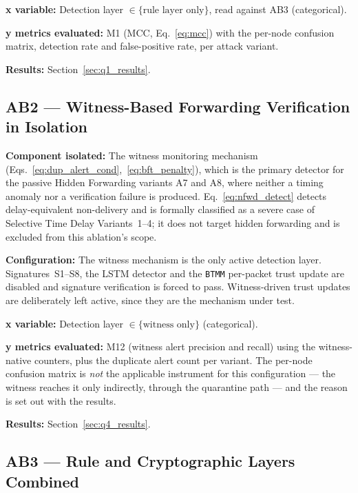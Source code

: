 \documentclass[12pt, a4paper]{report}
\begin{document}
{{\textbf{x variable:} Detection layer
$\in \{\text{rule layer only}\}$, read against AB3
(categorical).

\textbf{y metrics evaluated:} M1 (\ac{MCC},
Eq.~\ref{eq:mcc}) with the per-node confusion matrix,
detection rate and false-positive rate, per attack
variant.

\textbf{Results:} Section~\ref{sec:q1_results}.

\subsection{AB2 --- Witness-Based Forwarding
Verification in Isolation}
\label{sec:ab2}

\textbf{Component isolated:}
The witness monitoring mechanism
(Eqs.~\ref{eq:dup_alert_cond},~\ref{eq:bft_penalty}),
which is the primary detector for the passive
Hidden Forwarding variants A7 and A8, where neither
a timing anomaly nor a verification failure is
produced. Eq.~\ref{eq:nfwd_detect} detects
delay-equivalent non-delivery and is formally
classified as a severe case of Selective Time Delay
Variants~1--4; it does not target hidden forwarding
and is excluded from this ablation's scope.

\textbf{Configuration:}
The witness mechanism is the only active detection
layer. Signatures~S1--S8, the \ac{LSTM} detector and
the \texttt{BTMM} per-packet trust update are
disabled and signature verification is forced to
pass. Witness-driven trust updates are deliberately
left active, since they are the mechanism under
test.

\textbf{x variable:} Detection layer
$\in \{\text{witness only}\}$ (categorical).

\textbf{y metrics evaluated:} M12 (witness alert precision and recall) using the
witness-native counters, plus the duplicate alert
count per variant. The per-node confusion matrix is
\emph{not} the applicable instrument for this
configuration --- the witness reaches it only
indirectly, through the quarantine path --- and the
reason is set out with the results.

\textbf{Results:} Section~\ref{sec:q4_results}.

\subsection{AB3 --- Rule and Cryptographic Layers
Combined}
\label{sec:ab3}

}}
\end{document}
